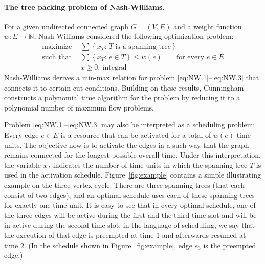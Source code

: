 \documentclass[runningheads]{llncs}
\newcommand{\N}{\mathbb{N}}
\begin{document}
\paragraph{The tree packing problem of Nash-Williams.}
For a given undirected connected graph $G=(V,E)$ and a weight function $w:E\to\N$,
Nash-Williams \cite{Nash-Williams1961} considered the following optimization problem:
\begin{align}
\text{maximize}~~ &\sum\left\{x_T:\,\text{$T$ is a spanning tree} \right\} 
\label{eq:NW.1} \\[0.5ex]
\text{such that}~~&\sum\left\{x_T:\,e\in T\right\}\le w(e)\qquad\text{for every $e\in E$}
\label{eq:NW.2} \\[0.5ex]
                 &x\ge0,~\text{integral}
\label{eq:NW.3} 
\end{align}
Nash-Williams \cite{Nash-Williams1961} derives a min-max relation for problem
\eqref{eq:NW.1}--\eqref{eq:NW.3} that connects it to certain cut conditions.
Building on these results, Cunningham \cite{Cunningham1985} constructs a polynomial time 
algorithm for the problem by reducing it to a polynomial number of maximum flow problems.

Problem \eqref{eq:NW.1}--\eqref{eq:NW.3} may also be interpreted as a scheduling problem:
Every edge $e\in E$ is a resource that can be activated for a total of $w(e)$ time units.
The objective now is to activate the edges in a such way that the graph remains connected 
for the longest possible overall time. 
Under this interpretation, the variable $x_T$ indicates the number of time units in which
the spanning tree $T$ is used in the activation schedule.
Figure~\ref{fig:example} contains a simple illustrating example on the three-vertex cycle.
There are three spanning trees (that each consist of two edges), and an optimal schedule 
uses each of these spanning trees for exactly one time unit.
It is easy to see that in every optimal schedule, one of the three edges will be active 
during the first and the third time slot and will be in-active during the second time slot;
in the language of scheduling, we say that the execution of that edge is preempted 
at time $1$ and afterwards resumed at time $2$.
(In the schedule shown in Figure~\ref{fig:example}, edge $e_3$ is the preempted edge.)
\end{document}

